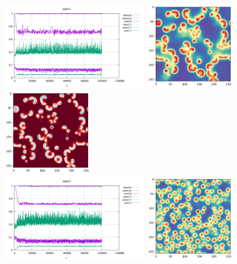 \begin{center}
\includegraphics[height=4.5cm]{python_codes/fieldstone_171/results/alpha1_stats}
\includegraphics[height=4.5cm]{python_codes/fieldstone_171/results/alpha1_solution_final_u.png}
\includegraphics[height=4.5cm]{python_codes/fieldstone_171/results/alpha1_solution_final_v.png}\\
\includegraphics[height=4.5cm]{python_codes/fieldstone_171/results/alpha2_stats}
\includegraphics[height=4.5cm]{python_codes/fieldstone_171/results/alpha2_solution_final_u.png}

\end{center}
